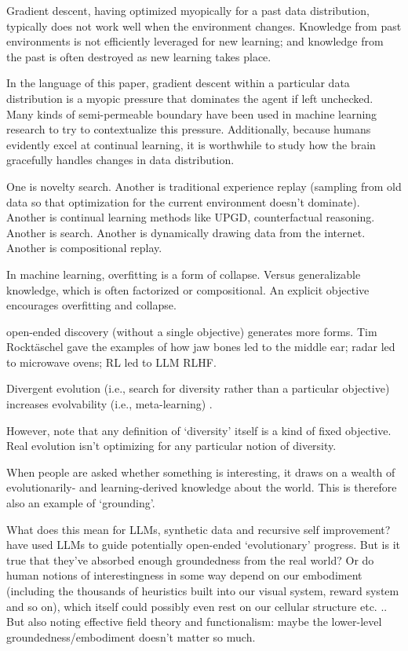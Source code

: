 Gradient descent, having optimized myopically for a past data distribution, typically does not work well when the environment changes. Knowledge from past environments is not efficiently leveraged for new learning; and knowledge from the past is often destroyed as new learning takes place.

In the language of this paper, gradient descent within a particular data distribution is a myopic pressure that dominates the agent if left unchecked. Many kinds of semi-permeable boundary have been used in machine learning research to try to contextualize this pressure. Additionally, because humans evidently excel at continual learning, it is worthwhile to study how the brain gracefully handles changes in data distribution.

One is novelty search. Another is traditional experience replay (sampling from old data so that optimization for the current environment doesn't dominate). Another is continual learning methods like UPGD, counterfactual reasoning. Another is search. Another is dynamically drawing data from the internet. Another is compositional replay.




In machine learning, overfitting is a form of collapse. Versus generalizable knowledge, which is often factorized or compositional. An explicit objective encourages overfitting and collapse.

open-ended discovery (without a single objective) generates more forms. Tim Rocktäschel gave the examples of how jaw bones led to the middle ear; radar led to microwave ovens; RL led to LLM RLHF. 


Divergent evolution (i.e., search for diversity rather than a particular objective) increases evolvability (i.e., meta-learning) \citep{wilder2015reconciling}.

However, note that any definition of `diversity' itself is a kind of fixed objective. Real evolution isn't optimizing for any particular notion of diversity. 

When people are asked whether something is interesting, it draws on a wealth of evolutionarily- and learning-derived knowledge about the world. This is therefore also an example of `grounding'. 

What does this mean for LLMs, synthetic data and recursive self improvement? \cite{zhang2023omni, fernando2023promptbreeder, romera2024mathematical, gottweis2025ai} have used LLMs to guide potentially open-ended `evolutionary' progress. But is it true that they've absorbed enough groundedness from the real world? Or do human notions of interestingness in some way depend on our embodiment (including the thousands of heuristics built into our visual system, reward system and so on), which itself could possibly even rest on our cellular structure etc. .. But also noting effective field theory and functionalism: maybe the lower-level groundedness/embodiment doesn't matter so much.


